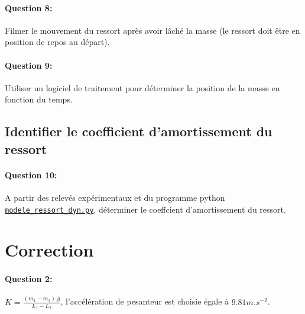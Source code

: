\paragraph{Question 8:} Filmer le mouvement du ressort après avoir lâché la masse (le ressort doit être en position de repos au départ).

\paragraph{Question 9:} Utiliser un logiciel de traitement pour déterminer la position de la masse en fonction du temps.

\subsection{Identifier le coefficient d'amortissement du ressort}

\paragraph{Question 10:} A partir des relevés expérimentaux et du programme python \\ \href{https://github.com/Costadoat/Sciences-Ingenieur/raw/master/S01\%20Analyse\%20fonctionnelle/TP01\%20Mesures\%20physiques/Ilot_02\%20Ressort/modele_ressort_dyn.py}{\texttt{modele\_ressort\_dyn.py}}, déterminer le coeffcient d'amortissement du ressort.

\clearpage

\ifdef{\public}{}{}

\newpage

\pagestyle{correction}

\section{Correction}

\paragraph{Question 2:} 

$K=\frac{(m_1-m_2).g}{L_1-L_2}$, l'accélération de pesanteur est choisie égale à $9.81m.s^{-2}$.


